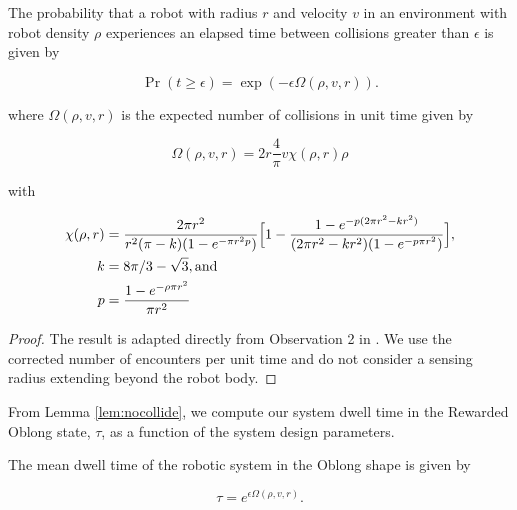 \documentclass[runningheads]{llncs}
\begin{document}
\begin{lemma} \label{lem:nocollide}
The probability that a robot with radius $r$ and velocity $v$ in an environment with robot density $\rho$ experiences an elapsed time between collisions greater than $\epsilon$ is given by

\begin{equation}
\Pr(t \geq \epsilon) = \exp(-\epsilon\Omega(\rho, v, r)).
\end{equation}

where $\Omega(\rho, v, r)$ is the expected number of collisions in unit time given by

\begin{equation*}
\Omega(\rho, v, r) = 2r \frac{4}{\pi} v \chi(\rho, r) \rho
\end{equation*}

with 

\begin{align*}
    \chi(\rho, r) & = \frac{2\pi r^2}{ r^2 (\pi - k)(1-e^{-\pi r^2 p})}\Bigl[1 - \frac{1-e^{-p(2\pi r^2 - kr^2)}}{(2\pi r^2 - k r^2)(1-e^{-p \pi r^2})}\Bigr], \\
    k & = 8\pi/3 - \sqrt{3}, \text{and} \\
    p & = \frac{1-e^{-\rho \pi r^2}}{\pi r^2}
\end{align*}

\end{lemma}

\begin{proof}
The result is adapted directly from Observation 2 in \cite{mayya2019closed}. We use the corrected number of encounters per unit time and do not consider a sensing radius extending beyond the robot body.
\end{proof}

From Lemma \ref{lem:nocollide}, we compute our system dwell time in the Rewarded Oblong state, $\tau$, as a function of the system design parameters. 


\begin{lemma}
The mean dwell time of the robotic system in the Oblong shape is given by

\begin{equation*}
  \tau = e^{\epsilon \Omega(\rho, v, r)}.  
\end{equation*}

\end{lemma}
\end{document}
